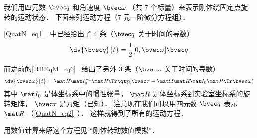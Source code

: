 

我们用四元数 $\bvec q$ 和角速度 $\bvec \omega$ （共 7 个标量）来表示刚体绕固定点旋转的运动状态． 下面来列运动方程（7 元一阶微分方程组）．

\autoref{QuatN_eq1}~ 中已经给出了 4 条（$\bvec q$ 关于时间的导数）
\begin{equation}
\dv{\bvec q}{t} = \frac12 [0, \bvec \omega] \bvec q
\end{equation}

而之前的\autoref{RBEqM_eq6}~ 给出了另外 3 条（$\bvec\omega$ 关于时间的导数）
\begin{equation}
\dv{\bvec \omega}{t} = \mat R \mat I_0^{-1} \mat R\Tr \qty(\bvec \tau  - \mat \Omega \mat R \mat I_0 \mat R\Tr \bvec\omega)
\end{equation}
其中 $\mat I_0$ 是体坐标系中的惯性张量， $\mat R$ 是体坐标系到实验室坐标系的旋转矩阵， $\bvec\tau$ 是力矩（已知）． 注意现在我们可以用四元数 $\bvec q$ 表示 $\mat R$ （\autoref{QuatN_eq2}~）． 这样就得到了所有的运动方程．

用数值计算来解这个方程见 “刚体转动数值模拟”．
